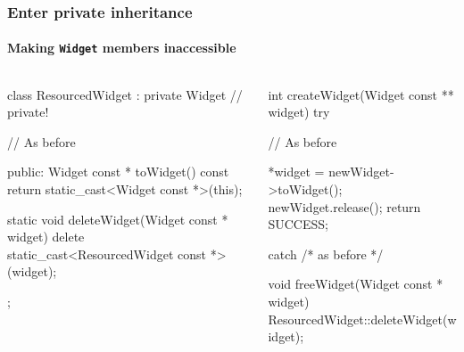 \documentclass{beamer}
\def\code#1{\texttt{#1}}
\begin{document}
\begin{frame}[fragile]
\frametitle{Enter private inheritance}
\framesubtitle{Making \code{Widget} members inaccessible}
\pause
\begin{columns}
\begin{column}{0.45\textwidth}
\begin{TinyC++}
class ResourcedWidget : private Widget // private!
{
	// As before

public:	
	Widget const * toWidget() const
	{
		return static_cast<Widget const *>(this);
	}
	
	static void deleteWidget(Widget const * widget)
	{
		delete static_cast<ResourcedWidget const *>(widget);
	}
};
\end{TinyC++}
\end{column}
\pause
\begin{column}{0.45\textwidth}
\begin{TinyC++}
int createWidget(Widget const ** widget)
try
{
	// As before
    
	*widget = newWidget->toWidget();
	newWidget.release();
	return SUCCESS;
}
catch /* as before */
\end{TinyC++}

\begin{TinyC++}
void freeWidget(Widget const * widget)
{
	ResourcedWidget::deleteWidget(widget);
}
\end{TinyC++}
\end{column}
\end{columns}
\end{frame}

\end{document}
